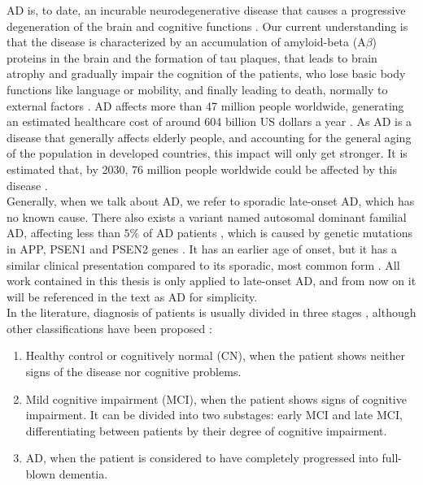 AD is, to date, an incurable neurodegenerative disease that causes a progressive degeneration of the brain and cognitive functions \cite{Lane2018}. Our current understanding is that the disease is characterized by an accumulation of amyloid-beta (A$\beta$) proteins in the brain and the formation of tau plaques, that leads to brain atrophy and gradually impair the cognition of the patients, who lose basic body functions like language or mobility, and finally leading to death, normally to external factors \cite{Ballard2011}. AD affects more than 47 million people worldwide, generating an estimated healthcare cost of around 604 billion US dollars a year \cite{AlzheimersAssociation}. As AD is a disease that generally affects elderly people, and accounting for the general aging of the population in developed countries, this impact will only get stronger. It is estimated that, by 2030, 76 million people worldwide could be affected by this disease \cite{AlzheimersAssociation}. \\

Generally, when we talk about AD, we refer to sporadic late-onset AD, which has no known cause. There also exists a variant named autosomal dominant familial AD, affecting less than $5\%$ of AD patients \cite{Bird1993}, which is caused by genetic mutations in APP, PSEN1 and PSEN2 genes \cite{Campion1999}. It has an earlier age of onset, but it has a similar clinical presentation compared to its sporadic, most common form \cite{Ryan2016}. All work contained in this thesis is only applied to late-onset AD, and from now on it will be referenced in the text as AD for simplicity. \\

In the literature, diagnosis of patients is usually divided in three stages \cite{Brookmeyer2007}, although other classifications have been proposed \cite{Jack2018}:

\begin{enumerate}\itemsep5pt
\item Healthy control or cognitively normal (CN), when the patient shows neither signs of the disease nor cognitive problems.
\item Mild cognitive impairment (MCI), when the patient shows signs of cognitive impairment. It can be divided into two substages: early MCI and late MCI, differentiating between patients by their degree of cognitive impairment.
\item AD, when the patient is considered to have completely progressed into full-blown dementia.
\end{enumerate}

